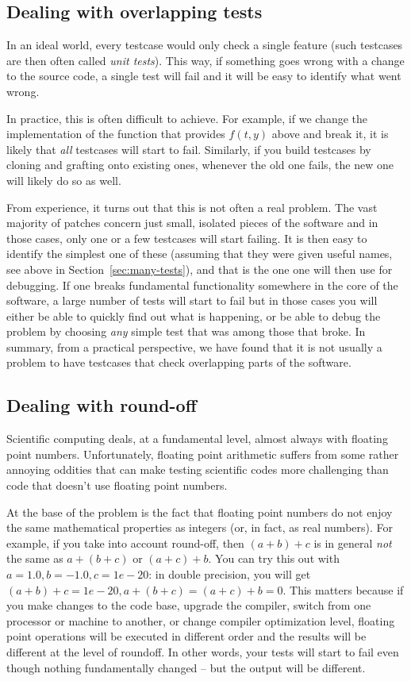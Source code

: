 \documentclass{article}
\begin{document}
\subsection{Dealing with overlapping tests}

In an ideal world, every testcase would only check a single feature (such
testcases are then often called \textit{unit tests}). This way, if something
goes wrong with a change to the source code, a single test will fail and it
will be easy to identify what went wrong.

In practice, this is often difficult to achieve. For example, if we change the
implementation of the function that provides $f(t,y)$ above and break it, it
is likely that \textit{all} testcases will start to fail. Similarly, if you
build testcases by cloning and grafting onto existing ones, whenever the old
one fails, the new one will likely do so as well.

From experience, it turns out that this is not often a real problem. The vast
majority of patches concern just small, isolated pieces of the software and in
those cases, only one or a few testcases will start failing. It is then easy
to identify the simplest one of these (assuming that they were given useful
names, see above in Section~\ref{sec:many-tests}), and that is the one one
will then use for debugging. If one breaks fundamental functionality somewhere
in the core of the software, a large number of tests will start to fail
but in those cases you will either be able to quickly find out what is
happening, or be able to debug the problem by choosing \textit{any} simple
test that was among those that broke. In summary, from a practical
perspective, we have found that it is not usually a problem to have testcases
that check overlapping parts of the software.


\subsection{Dealing with round-off}

Scientific computing deals, at a fundamental level, almost always with
floating point numbers. Unfortunately, floating point arithmetic suffers from
some rather annoying oddities that can make testing scientific codes more
challenging than code that doesn't use floating point numbers.

At the base of the problem is the fact that floating point numbers do not
enjoy the same mathematical properties as integers (or, in fact, as real
numbers). For example, if you take into account round-off, then $(a+b)+c$ is in
general \textit{not} the same as $a+(b+c)$ or $(a+c)+b$. You can try this out
with $a=1.0, b=-1.0, c=1e-20$: in double precision, you will get
$(a+b)+c=1e-20, a+(b+c)=(a+c)+b=0$. This matters because if you make changes
to the code base, upgrade the compiler, switch from one processor or machine
to another, or change compiler optimization level, floating point operations
will be executed in different order and the results will be different at the
level of roundoff. In other words, your tests will start to fail even though
nothing fundamentally changed -- but the output will be different.
\end{document}
